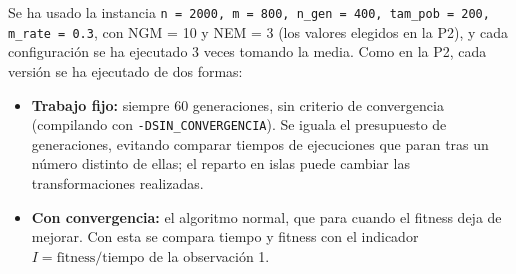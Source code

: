 \documentclass[12pt]{article}
\begin{document}
\begin{enumerate}
Se ha usado la instancia \texttt{n = 2000, m = 800, n\_gen = 400, tam\_pob = 200, m\_rate = 0.3}, con NGM = 10 y NEM = 3 (los valores elegidos en la P2), y cada configuración se ha ejecutado 3 veces tomando la media. Como en la P2, cada versión se ha ejecutado de dos formas:

\begin{itemize}
    \item \textbf{Trabajo fijo:} siempre 60 generaciones, sin criterio de convergencia (compilando con \texttt{-DSIN\_CONVERGENCIA}). Se iguala el presupuesto de generaciones, evitando comparar tiempos de ejecuciones que paran tras un número distinto de ellas; el reparto en islas puede cambiar las transformaciones realizadas.
    \item \textbf{Con convergencia:} el algoritmo normal, que para cuando el fitness deja de mejorar. Con esta se compara tiempo y fitness con el indicador $I = \text{fitness}/\text{tiempo}$ de la observación 1.
\end{itemize}


\end{enumerate}
\end{document}
